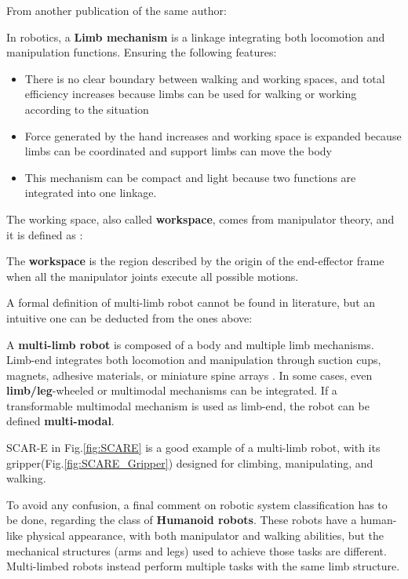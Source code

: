 From another publication of the same author\cite{Koyachi3}:  
\begin{definition}\label{def:limb_mechanism2}
In robotics, a \textbf{Limb mechanism} is a linkage integrating both locomotion and manipulation functions.
Ensuring the following features: 
\begin{itemize}
\item There is no clear boundary between walking and working spaces, and total efficiency increases because limbs can be used for walking or working according to the situation
\item Force generated by the hand increases and working space
is expanded because limbs can be coordinated and support
limbs can move the body
\item This mechanism can be compact and light because two
functions are integrated into one linkage.
\end{itemize}
\end{definition}
The working space, also called \textbf{workspace}, comes from manipulator theory, and it is defined as \cite{Siciliano}:
\begin{definition}\label{def:workspace}
The \textbf{workspace} is the region described by the origin of the end-eﬀector frame when all the manipulator joints execute all possible motions.
\end{definition}

A formal definition of multi-limb robot cannot be found in literature, but an intuitive one can be deducted from the ones above: 

\begin{definition}\label{def:multilimb_robot}
A \textbf{multi-limb robot} is composed of a body and multiple limb mechanisms. Limb-end integrates both locomotion and manipulation through suction cups, magnets, adhesive materials, or miniature spine arrays \cite{Legged}\cite{Hirose1991}\cite{HorizontaltoVertical}\cite{passiveSpineTohoku}. In some cases, even \textbf{limb/leg}-wheeled \cite{AnymalDocThesis}\cite{WheelLegged}\cite{MAMMOTH}\cite{RollerWalker}\cite{HopperLegWheel} or multimodal mechanisms can be integrated\cite{GrieelUda}\cite{Armadillo}. If a transformable multimodal mechanism is used as limb-end, the robot can be defined \textbf{multi-modal}.
\end{definition}
SCAR-E in Fig.\ref{fig:SCARE} is a good example of a multi-limb robot, with its gripper(Fig.\ref{fig:SCARE_Gripper}) designed for climbing, manipulating, and walking.

To avoid any confusion, a final comment on robotic system classification has to be done, regarding the class of \textbf{Humanoid robots}\cite{HumanoidRobot}. These robots have a human-like physical appearance, with both manipulator and walking abilities, but the mechanical structures (arms and legs) used to achieve those tasks are different. Multi-limbed robots instead perform multiple tasks with the same limb structure. 

